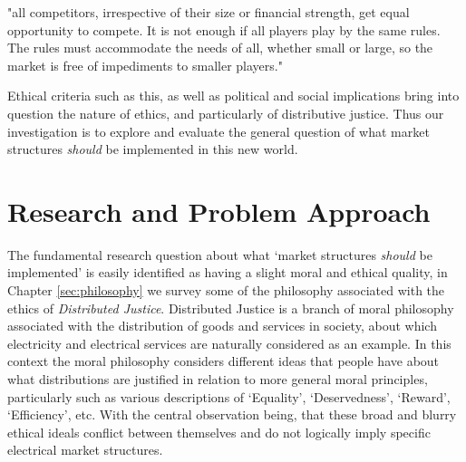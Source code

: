 "all competitors, irrespective of their size or financial strength, get equal opportunity to compete. It is not enough if all players play by the same rules. The rules must accommodate the needs of all, whether small or large, so the market is free of impediments to smaller players." \cite{australianenergymarketoperatorlimited2018}

Ethical criteria such as this, as well as political and social implications bring into question the nature of ethics, and particularly of distributive justice. 
Thus our investigation is to explore and evaluate the general question of what market structures \textit{should} be implemented in this new world.

\section{Research and Problem Approach}

The fundamental research question about what `market structures \textit{should} be implemented' is easily identified as having a slight moral and ethical quality, in Chapter \ref{sec:philosophy} we survey some of the philosophy associated with the ethics of \textit{Distributed Justice}.
Distributed Justice is a branch of moral philosophy associated with the distribution of goods and services in society, about which electricity and electrical services are naturally considered as an example.
In this context the moral philosophy considers different ideas that people have about what distributions are justified in relation to more general moral principles, particularly such as various descriptions of `Equality', `Deservedness', `Reward', `Efficiency', etc. 
With the central observation being, that these broad and blurry ethical ideals conflict between themselves and do not logically imply specific electrical market structures.


